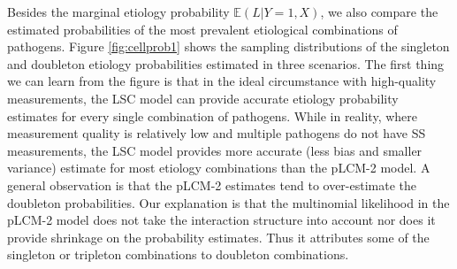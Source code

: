 \documentclass[11 pt, a4paper]{article}  %
\begin{document}
Besides the marginal etiology probability $\mathbb{E}(L|Y = 1, X)$, we also compare the estimated probabilities of the most prevalent etiological combinations of pathogens. Figure \ref{fig:cellprob1} shows the sampling distributions of the singleton and doubleton etiology probabilities estimated in three scenarios. The first thing we can learn from the figure is that in the ideal circumstance with high-quality measurements, the LSC model can provide accurate etiology probability estimates for every single combination of pathogens. While in reality, where measurement quality is relatively low and multiple pathogens do not have SS measurements, the LSC model provides more accurate (less bias and smaller variance) estimate for most etiology combinations than the pLCM-2 model. A general observation is that the pLCM-2 estimates tend to over-estimate the doubleton probabilities. Our explanation is that the multinomial likelihood in the pLCM-2 model does not take the interaction structure into account nor does it provide shrinkage on the probability estimates. Thus it attributes some of the singleton or tripleton combinations to doubleton combinations. 
\end{document}
